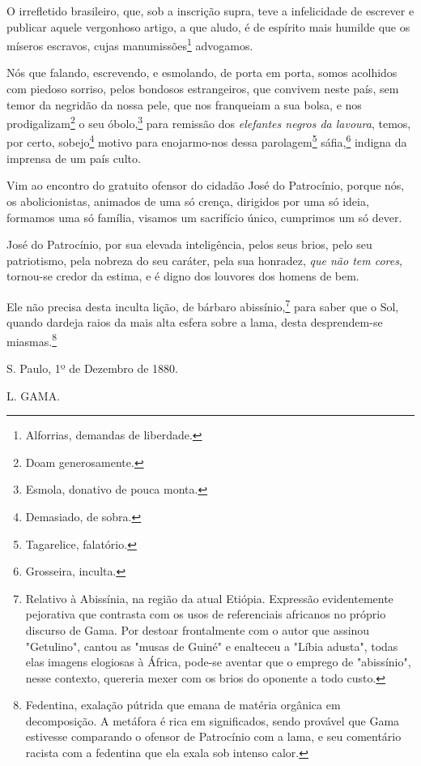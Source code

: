 O irrefletido brasileiro, que, sob a inscrição supra, teve a
infelicidade de escrever e publicar aquele vergonhoso artigo, a que
aludo, é de espírito mais humilde que os míseros escravos, cujas
manumissões\footnote{Alforrias, demandas de liberdade.} advogamos.

Nós que falando, escrevendo, e esmolando, de porta em porta, somos
acolhidos com piedoso sorriso, pelos bondosos estrangeiros, que convivem
neste país, sem temor da negridão da nossa pele, que nos franqueiam a
sua bolsa, e nos prodigalizam\footnote{Doam generosamente.} o seu
óbolo,\footnote{Esmola, donativo de pouca monta.} para remissão dos
\emph{elefantes negros da lavoura}, temos, por certo, sobejo\footnote{
  Demasiado, de sobra.} motivo para enojarmo-nos dessa
parolagem\footnote{Tagarelice, falatório.} sáfia,\footnote{
  Grosseira, inculta.} indigna da imprensa de um país culto.

Vim ao encontro do gratuito ofensor do cidadão José do Patrocínio,
porque nós, os abolicionistas, animados de uma só crença, dirigidos por
uma só ideia, formamos uma só família, visamos um sacrifício único,
cumprimos um só dever.

José do Patrocínio, por sua elevada inteligência, pelos seus brios, pelo
seu patriotismo, pela nobreza do seu caráter, pela sua honradez,
\emph{que não tem cores}, tornou-se credor da estima, e é digno dos
louvores dos homens de bem.

Ele não precisa desta inculta lição, de bárbaro abissínio,\footnote{
  Relativo à Abissínia, na região da atual Etiópia. Expressão
  evidentemente pejorativa que contrasta com os usos de referenciais
  africanos no próprio discurso de Gama. Por destoar frontalmente com o
  autor que assinou "Getulino", cantou as "musas de Guiné" e enalteceu a
  "Líbia adusta", todas elas imagens elogiosas à África, pode-se aventar
  que o emprego de "abissínio", nesse contexto, quereria mexer com os
  brios do oponente a todo custo.} para saber que o Sol, quando dardeja
raios da mais alta esfera sobre a lama, desta desprendem-se
miasmas.\footnote{Fedentina, exalação pútrida que emana de matéria
  orgânica em decomposição. A metáfora é rica em significados, sendo
  provável que Gama estivesse comparando o ofensor de Patrocínio com a
  lama, e seu comentário racista com a fedentina que ela exala sob
  intenso calor.}

S. Paulo, 1º de Dezembro de
1880.

L. GAMA.

\pagebreak
\mbox{}\vfill
\thispagestyle{empty}

